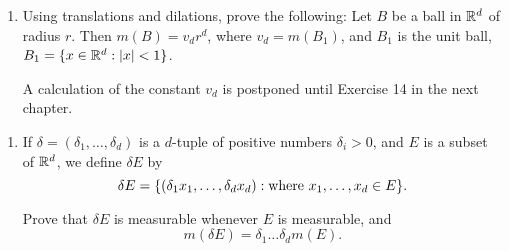 \documentclass{../homework}
\begin{document}
\begin{problems}
  \begin{solution}
    \begin{problems}
    \item
    \item
    \end{problems}
  \end{solution}

  \begin{book}
    \begin{enumerate}[start=6]
    \item Using translations and dilations, prove the following: Let
      \(B\) be a ball in \(\mathbb R^d\) of radius \(r\).  Then
      \(m(B) = v_d r^d\), where \(v_d = m(B_1)\), and \(B_1\) is the
      unit ball, \(B_1 = \{x \in \mathbb R^d : \lvert x\rvert < 1\}\).

      A calculation of the constant \(v_d\) is postponed until
      Exercise 14 in the next chapter.
    \end{enumerate}
  \end{book}

  \begin{solution}
  \end{solution}

  \begin{book}
    \begin{enumerate}[start=7]
    \item If \(\delta = (\delta_1, \dots, \delta_d)\) is a \(d\)-tuple
      of positive numbers \(\delta_i > 0\), and \(E\) is a subset of
      \(\mathbb R^d\), we define \(\delta E\) by
      \[
        \delta E = \{
          (\delta_1 x_1, \dots, \delta_d x_d)
          : \text{where \(x_1, \dots, x_d \in E\)}
        \}.
      \]

      Prove that \(\delta E\) is measurable whenever \(E\) is
      measurable, and
      \[
        m(\delta E) = \delta_1 \dots \delta_d m(E).
      \]
    \end{enumerate}
  \end{book}

  \begin{solution}
  \end{solution}


\end{problems}
\end{document}
